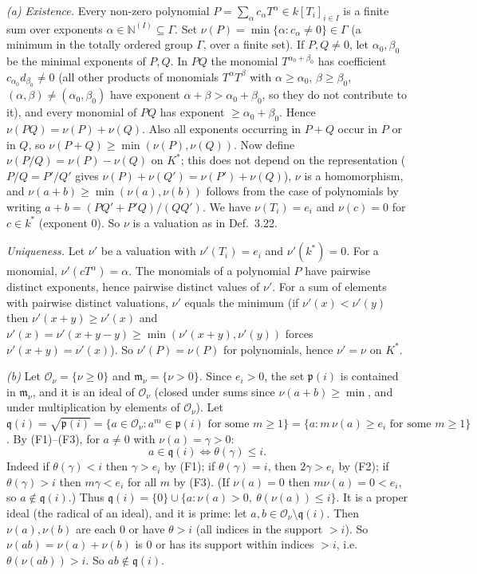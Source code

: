 \documentclass[11pt]{article}
\begin{document}
\emph{(a) Existence.} Every non-zero polynomial $P=\sum_\alpha c_\alpha T^\alpha\in k[T_i]_{i\in I}$ is a finite sum over exponents $\alpha\in\mathbb{N}^{(I)}\subseteq\Gamma$. Set $\nu(P)=\min\{\alpha:c_\alpha\neq0\}\in\Gamma$ (a minimum in the totally ordered group $\Gamma$, over a finite set). If $P,Q\neq0$, let $\alpha_0,\beta_0$ be the minimal exponents of $P,Q$. In $PQ$ the monomial $T^{\alpha_0+\beta_0}$ has coefficient $c_{\alpha_0}d_{\beta_0}\neq0$ (all other products of monomials $T^\alpha T^\beta$ with $\alpha\ge\alpha_0$, $\beta\ge\beta_0$, $(\alpha,\beta)\neq(\alpha_0,\beta_0)$ have exponent $\alpha+\beta>\alpha_0+\beta_0$, so they do not contribute to it), and every monomial of $PQ$ has exponent $\ge\alpha_0+\beta_0$. Hence $\nu(PQ)=\nu(P)+\nu(Q)$. Also all exponents occurring in $P+Q$ occur in $P$ or in $Q$, so $\nu(P+Q)\ge\min(\nu(P),\nu(Q))$. Now define $\nu(P/Q)=\nu(P)-\nu(Q)$ on $K^*$; this does not depend on the representation ($P/Q=P'/Q'$ gives $\nu(P)+\nu(Q')=\nu(P')+\nu(Q)$), $\nu$ is a homomorphism, and $\nu(a+b)\ge\min(\nu(a),\nu(b))$ follows from the case of polynomials by writing $a+b=(PQ'+P'Q)/(QQ')$. We have $\nu(T_i)=e_i$ and $\nu(c)=0$ for $c\in k^*$ (exponent $0$). So $\nu$ is a valuation as in Def.~3.22.

\emph{Uniqueness.} Let $\nu'$ be a valuation with $\nu'(T_i)=e_i$ and $\nu'(k^*)=0$. For a monomial, $\nu'(cT^\alpha)=\alpha$. The monomials of a polynomial $P$ have pairwise distinct exponents, hence pairwise distinct values of $\nu'$. For a sum of elements with pairwise distinct valuations, $\nu'$ equals the minimum (if $\nu'(x)<\nu'(y)$ then $\nu'(x+y)\ge\nu'(x)$ and $\nu'(x)=\nu'(x+y-y)\ge\min(\nu'(x+y),\nu'(y))$ forces $\nu'(x+y)=\nu'(x)$). So $\nu'(P)=\nu(P)$ for polynomials, hence $\nu'=\nu$ on $K^*$.

\emph{(b)} Let $\mathcal{O}_\nu=\{\nu\ge0\}$ and $\mathfrak{m}_\nu=\{\nu>0\}$. Since $e_i>0$, the set $\mathfrak p(i)$ is contained in $\mathfrak m_\nu$, and it is an ideal of $\mathcal{O}_\nu$ (closed under sums since $\nu(a+b)\ge\min$, and under multiplication by elements of $\mathcal{O}_\nu$). Let $\mathfrak q(i)=\sqrt{\mathfrak p(i)}=\{a\in\mathcal{O}_\nu:a^m\in\mathfrak p(i)\text{ for some }m\ge1\}=\{a:m\,\nu(a)\ge e_i\text{ for some }m\ge1\}$. By (F1)--(F3), for $a\neq0$ with $\nu(a)=\gamma>0$:
\[ a\in\mathfrak q(i)\iff\theta(\gamma)\le i. \]
Indeed if $\theta(\gamma)<i$ then $\gamma>e_i$ by (F1); if $\theta(\gamma)=i$, then $2\gamma>e_i$ by (F2); if $\theta(\gamma)>i$ then $m\gamma<e_i$ for all $m$ by (F3). (If $\nu(a)=0$ then $m\nu(a)=0<e_i$, so $a\notin\mathfrak q(i)$.) Thus $\mathfrak q(i)=\{0\}\cup\{a:\nu(a)>0,\ \theta(\nu(a))\le i\}$. It is a proper ideal (the radical of an ideal), and it is prime: let $a,b\in\mathcal{O}_\nu\setminus\mathfrak q(i)$. Then $\nu(a),\nu(b)$ are each $0$ or have $\theta>i$ (all indices in the support $>i$). So $\nu(ab)=\nu(a)+\nu(b)$ is $0$ or has its support within indices $>i$, i.e.\ $\theta(\nu(ab))>i$. So $ab\notin\mathfrak q(i)$.
\end{document}
